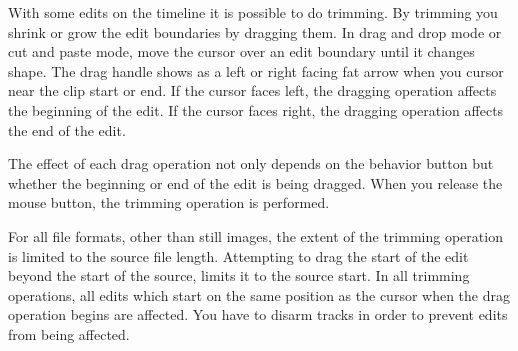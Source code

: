 With some edits on the timeline it is possible to do trimming. By trimming you shrink or grow the edit boundaries by dragging them. In drag and drop mode or cut and paste mode, move the cursor over an edit boundary until it changes shape. The drag handle shows as a left or right facing fat arrow when you cursor near the clip start or end.  If the cursor faces left, the dragging operation affects the beginning of the edit. If the cursor faces right, the dragging operation affects the end of the edit.

The effect of each drag operation not only depends on the behavior button but whether the beginning or end of the edit is being dragged. When you release the mouse button, the trimming operation is performed.

For all file formats, other than still images, the extent of the trimming operation is limited to the source file length. Attempting to drag the start of the edit beyond the start of the source, limits it to the source start. In all trimming operations, all edits which start on the same position as the cursor when the drag operation begins are affected. You have to disarm tracks in order to prevent edits from being affected.

